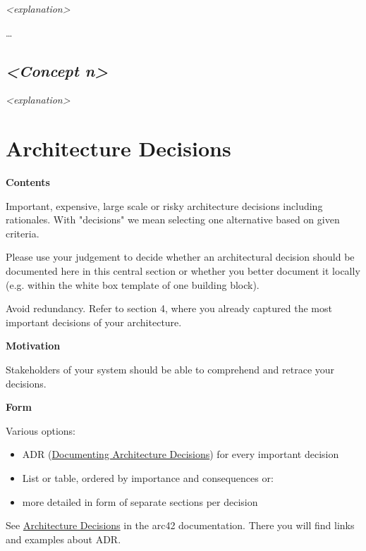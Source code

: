 \documentclass[
]{article}
\begin{document}
\emph{\textless explanation\textgreater{}}

\ldots{}

\hypertarget{__emphasis_concept_n_emphasis}{%
\subsection{\texorpdfstring{\emph{\textless Concept
n\textgreater{}}}{\textless Concept n\textgreater{}}}\label{__emphasis_concept_n_emphasis}}

\emph{\textless explanation\textgreater{}}

\hypertarget{section-design-decisions}{%
\section{Architecture Decisions}\label{section-design-decisions}}

\textbf{Contents}

Important, expensive, large scale or risky architecture decisions
including rationales. With "decisions" we mean selecting one alternative
based on given criteria.

Please use your judgement to decide whether an architectural decision
should be documented here in this central section or whether you better
document it locally (e.g. within the white box template of one building
block).

Avoid redundancy. Refer to section 4, where you already captured the
most important decisions of your architecture.

\textbf{Motivation}

Stakeholders of your system should be able to comprehend and retrace
your decisions.

\textbf{Form}

Various options:

\begin{itemize}
\item
  ADR
  (\href{https://cognitect.com/blog/2011/11/15/documenting-architecture-decisions}{Documenting
  Architecture Decisions}) for every important decision
\item
  List or table, ordered by importance and consequences or:
\item
  more detailed in form of separate sections per decision
\end{itemize}

See \href{https://docs.arc42.org/section-9/}{Architecture Decisions} in
the arc42 documentation. There you will find links and examples about
ADR.
\end{document}
